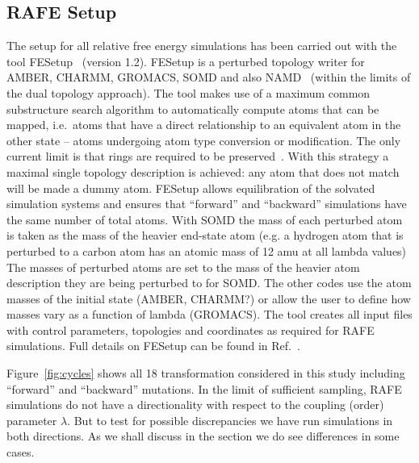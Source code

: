\documentclass[journal=jctcce,manuscript=article]{achemso}
\begin{document}
\subsection{RAFE Setup}
\label{sec:rafe_setup}

The setup for all relative free energy simulations has been carried
out with the tool FESetup~\cite{loeffler_fesetup:_2015} (version
1.2).  FESetup is a perturbed topology writer for AMBER, CHARMM,
GROMACS, SOMD and also NAMD~\cite{JCC:JCC20289} (within the
limits of the dual topology approach).  The tool makes use of a
maximum common substructure search algorithm to automatically compute
atoms that can be mapped, i.e.\ atoms that have a direct relationship
to an equivalent atom in the other state -- atoms undergoing atom type conversion or modification.  The only current limit is that rings are
required to be preserved~\cite{doi:10.1021/acs.jcim.5b00057}.  With this
strategy a maximal single topology description is achieved: any atom that
does not match will be made a dummy atom.  FESetup allows
equilibration of the solvated simulation systems and ensures that
``forward'' and ``backward'' simulations have the same number of
total atoms.  With SOMD the mass of each perturbed atom is taken as the mass of the heavier end-state atom (e.g. a hydrogen atom that is perturbed to a carbon atom has an atomic mass of 12 amu at all lambda values)  The masses of perturbed atoms are set to the mass of the heavier atom description  they are being perturbed to for SOMD.
  The other codes use the atom masses of the initial state (AMBER, CHARMM?) or allow the user to define how masses vary as a function of lambda (GROMACS).
The tool creates all input files with control
parameters, topologies and coordinates as required for RAFE
simulations.  Full details on FESetup can be found in
Ref.~.

Figure~\ref{fig:cycles} shows all 18 transformation considered in this
study including ``forward'' and ``backward'' mutations.  In the limit of sufficient sampling, RAFE simulations do not have a directionality with respect to the coupling (order) parameter $\lambda$. But to test for possible discrepancies we have run 
simulations in both directions.  As we shall discuss in the 
 section we do see differences in some cases.
\end{document}
